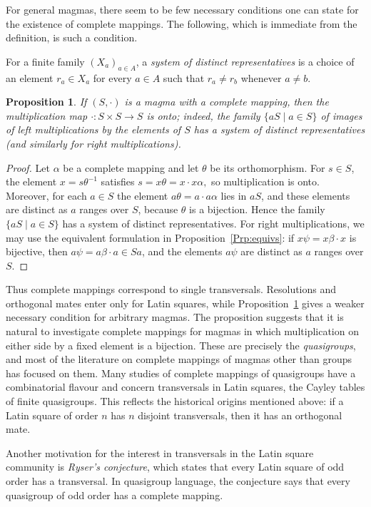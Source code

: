 \documentclass[11pt]{article}
\theoremstyle{plain}
\newtheorem{prop}[theorem]{Proposition}
\theoremstyle{remark}
\theoremstyle{definition}
\theoremstyle{plain}
\begin{document}
For general magmas, there seem to be few necessary conditions one can state for the existence of complete mappings. The following, which is immediate from the definition, is such a condition.

{For a finite family $(X_a)_{a\in A}$, a \emph{system of distinct
representatives} is a choice of an element $r_a\in X_a$ for every $a\in A$
such that $r_a\ne r_b$ whenever $a\ne b$.}

\begin{prop}\label{Prp:onto}
If $(S,\cdot)$ is a magma with a complete mapping, then the multiplication map $\cdot\colon S\times S\to S$ is onto; indeed, the family $\{aS\mid a\in S\}$ of images of left multiplications by the elements of $S$ has a system of
distinct representatives (and similarly for right multiplications).
\end{prop}

\begin{proof}
Let $\alpha$ be a complete mapping and let $\theta$ be its orthomorphism. For
$s\in S$, the element $x=s\theta^{-1}$ satisfies
\(s=x\theta=x\cdot x\alpha,\)
so multiplication is onto. Moreover, for each $a\in S$ the element
\(a\theta=a\cdot a\alpha\)
lies in $aS$, and these elements are distinct as $a$ ranges over $S$, because
$\theta$ is a bijection. Hence the family $\{aS\mid a\in S\}$ has a system of
distinct representatives. For right multiplications, we may use
the equivalent formulation in Proposition~\ref{Prp:equivs}: if
$x\psi=x\beta\cdot x$ is bijective, then $a\psi=a\beta\cdot a\in Sa$, and
the elements $a\psi$ are distinct as $a$ ranges over $S$.
\end{proof}

Thus complete mappings correspond to single transversals.
Resolutions and orthogonal mates enter only for Latin squares, while
Proposition~\ref{Prp:onto} gives a weaker necessary condition for arbitrary
magmas.
The proposition suggests that it is natural to investigate complete mappings for magmas in which multiplication on either side by a fixed element is a bijection. These are precisely the \emph{quasigroups}, and most of the literature on complete mappings of magmas other than groups has focused on them. Many studies of complete mappings of quasigroups have a combinatorial flavour and concern transversals in Latin squares, the Cayley tables of finite quasigroups. This reflects the historical origins mentioned above: if a Latin square of order $n$ has $n$ disjoint transversals, then it has an orthogonal mate.

Another motivation for the interest in transversals in the Latin square community is \emph{Ryser's conjecture}, which states that every Latin square of odd order has a transversal. In quasigroup language, the conjecture says that every quasigroup of odd order has a complete mapping.
\end{document}
